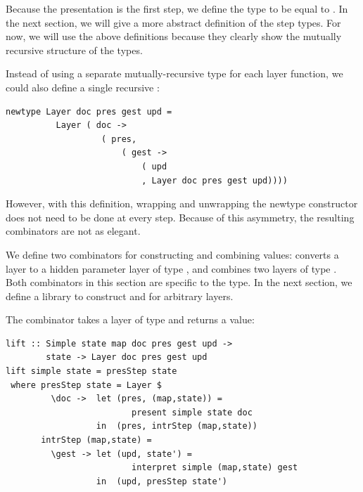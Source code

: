 \documentclass[preprint,natbib]{sigplanconf}
\begin{document}
Because the presentation is the first step, we define the  type to be equal to . In the next section, we will give a more abstract definition of the step types. For now, we will use the above definitions because they clearly show the mutually recursive structure of the types. %

Instead of using a separate mutually-recursive type for each layer function, we could also define a single recursive :
\ec
\begin{small}
\begin{verbatim}
newtype Layer doc pres gest upd = 
          Layer ( doc -> 
                   ( pres, 
                       ( gest -> 
                           ( upd 
                           , Layer doc pres gest upd))))
\end{verbatim}
\end{small}

\bc

However, with this definition, wrapping and unwrapping the newtype constructor does not need to be done at every step. Because of this asymmetry, the resulting combinators are not as elegant.
\ec

We define two combinators for constructing and combining  values:  converts  a  layer to a hidden parameter layer of type , and  combines two layers of type . Both combinators in this section are specific to the  type. In the next section, we define a library to construct  and  for arbitrary layers.



The combinator  takes a layer of type  and returns a  value:

\begin{small}
\begin{verbatim}
lift :: Simple state map doc pres gest upd ->
        state -> Layer doc pres gest upd
lift simple state = presStep state 
 where presStep state = Layer $
         \doc ->  let (pres, (map,state)) = 
                         present simple state doc                                         
                  in  (pres, intrStep (map,state))
       intrStep (map,state) =
         \gest -> let (upd, state') = 
                         interpret simple (map,state) gest                     
                  in  (upd, presStep state')
\end{verbatim}%
\end{small}
\end{document}
